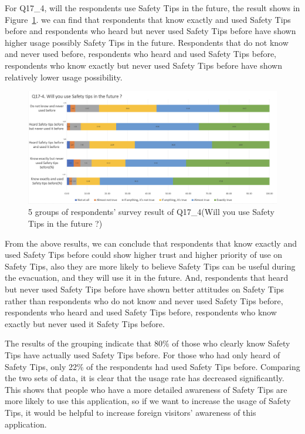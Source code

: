 For Q17\_4, will the respondents use Safety Tips in the future, the result shows in Figure~\ref{fig22}. we can find that respondents that know exactly and used Safety Tips before and respondents who heard but never used Safety Tips before have shown higher usage possibly Safety Tips in the future. Respondents that do not know and never used before, respondents who heard and used Safety Tips before, respondents who know exactly but never used Safety Tips before have shown relatively lower usage possibility.

\begin{figure}[h]
  \includegraphics[width=0.8\linewidth]{Figure/Figure22.jpg}
  \centering
  \caption[5 groups of respondents' survey result of Q17\_4]{5 groups of respondents' survey result of Q17\_4(Will you use Safety Tips in the future ?)}
  \label{fig22}
\end{figure}

From the above results, we can conclude that respondents that know exactly and used Safety Tips before could show higher trust and higher priority of use on Safety Tips, also they are more likely to believe Safety Tips can be useful during the evacuation, and they will use it in the future. And, respondents that heard but never used  Safety Tips before have shown better attitudes on Safety Tips rather than respondents who do not know and never used  Safety Tips before, respondents who heard and used Safety Tips before, respondents who know exactly but never used it Safety Tips before.

The results of the grouping indicate that 80\% of those who clearly know Safety Tips have actually used Safety Tips before. For those who had only heard of Safety Tips, only 22\% of the respondents had used Safety Tips before. Comparing the two sets of data, it is clear that the usage rate has decreased significantly. This shows that people who have a more detailed awareness of Safety Tips are more likely to use this application, so if we want to increase the usage of Safety Tips, it would be helpful to increase foreign visitors' awareness of this application.
\cleardoublepage
